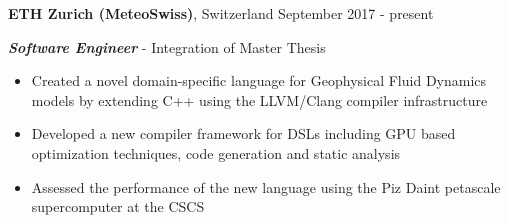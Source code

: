 \textbf{ETH Zurich (MeteoSwiss)}, Switzerland  \hfill September 2017 - present

\textbf{\textit{Software Engineer}} - Integration of Master Thesis
\begin{itemize}
    \item Created a novel domain-specific language for Geophysical Fluid Dynamics models by extending C++ using the LLVM/Clang compiler infrastructure
	\item Developed a new compiler framework for DSLs including GPU based optimization techniques, code generation and static analysis
	\item Assessed the performance of the new language using the Piz Daint petascale supercomputer at the CSCS
\end{itemize}
